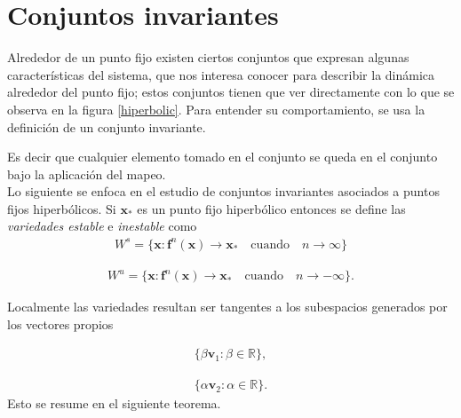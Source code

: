 \section{Conjuntos invariantes}
Alrededor de un punto fijo existen ciertos conjuntos que expresan algunas ca\-rac\-te\-rís\-ti\-cas del sistema, que nos interesa conocer para describir la dinámica alrededor del punto fijo; estos conjuntos tienen que ver directamente con lo que se observa en la figura \ref{hiperbolic}. Para entender su comportamiento, se usa la definición de un conjunto invariante.

Es decir que cualquier elemento tomado en el conjunto se queda en el conjunto bajo la aplicación del mapeo. \\

Lo siguiente se enfoca en el estudio de conjuntos invariantes asociados a puntos fijos hiperbólicos. Si $\mathbf{x}_{*}$ es un punto fijo hiperbólico entonces se define las \textit{variedades estable} e \textit{inestable} como
\begin{eqnarray}
W^{s}=\lbrace \mathbf{x} : \mathbf{f}^{n}(\mathbf{x})\rightarrow \mathbf{x}_{*} \quad \mathrm{cuando} \quad n\rightarrow \infty \rbrace
\label{variedad estable}
\end{eqnarray}

\begin{eqnarray}
W^{u}=\lbrace \mathbf{x} : \mathbf{f}^{n}(\mathbf{x})\rightarrow \mathbf{x}_{*} \quad \mathrm{cuando} \quad n\rightarrow -\infty \rbrace.
\label{variedad inestable}
\end{eqnarray}


Localmente las variedades resultan ser tangentes a los subespacios generados por los vectores propios

\begin{eqnarray*}
\lbrace \beta \pmb v_{1} : \beta\in \mathbb{R} \rbrace,
\end{eqnarray*}

\begin{eqnarray*}
\lbrace \alpha \pmb v_{2} : \alpha\in \mathbb{R}\rbrace.
\end{eqnarray*}
Esto se resume en el siguiente teorema.







